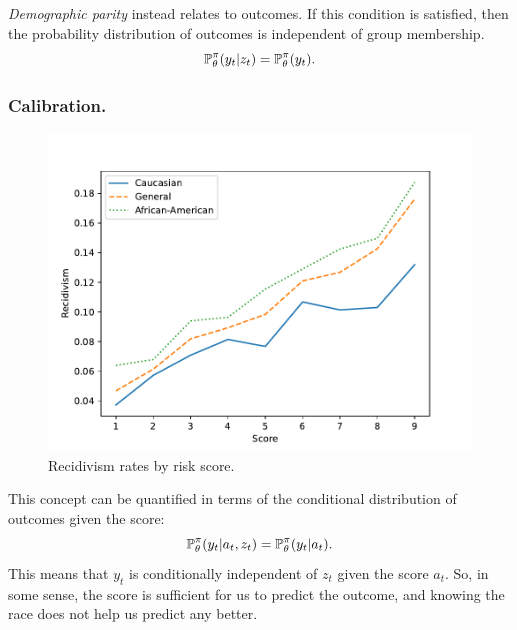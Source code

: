 \begin{frame}
{    \emph{Demographic parity} instead relates to outcomes. If this
    condition is satisfied, then the probability distribution of
    outcomes is independent of group membership.
    \begin{equation}
      \label{eq:eqality-outcomes}
      \mathop{\mbox{\ensuremath{\mathbb{P}}}}\nolimits_\theta^\pi(y_t | z_t) =       \mathop{\mbox{\ensuremath{\mathbb{P}}}}\nolimits_\theta^\pi(y_t ).
    \end{equation}

  }
\end{frame}

\begin{frame}
  \frametitle{Calibration.}
  
  \begin{figure}[H]
    \centering
    \includegraphics[width=\fwidth]{../figures/calibration-compas}
    \caption{Recidivism rates by risk score.}
    \label{fig:imrs}
  \end{figure}
  This concept can be quantified in terms of the conditional distribution of outcomes given the score:
  \begin{equation}
    \mathop{\mbox{\ensuremath{\mathbb{P}}}}\nolimits_\theta^\pi(y_t | a_t, z_t) =       \mathop{\mbox{\ensuremath{\mathbb{P}}}}\nolimits_\theta^\pi(y_t | a_t).
    \label{eq:calibration}
  \end{equation}
  This means that $y_t$ is conditionally independent of $z_t$ given
  the score $a_t$. So, in some sense, the score is sufficient for us
  to predict the outcome, and knowing the race does not help us
  predict any better.  
\end{frame}

